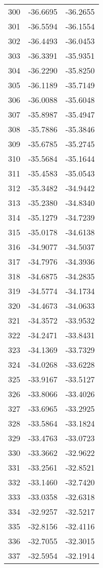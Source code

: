 \documentclass{article}
\begin{document}
\begin{longtable}{|c|c|c|}
300 & -36.6695 & -36.2655 \\
301 & -36.5594 & -36.1554 \\
302 & -36.4493 & -36.0453 \\
303 & -36.3391 & -35.9351 \\
304 & -36.2290 & -35.8250 \\
305 & -36.1189 & -35.7149 \\
306 & -36.0088 & -35.6048 \\
307 & -35.8987 & -35.4947 \\
308 & -35.7886 & -35.3846 \\
309 & -35.6785 & -35.2745 \\
310 & -35.5684 & -35.1644 \\
311 & -35.4583 & -35.0543 \\
312 & -35.3482 & -34.9442 \\
313 & -35.2380 & -34.8340 \\
314 & -35.1279 & -34.7239 \\
315 & -35.0178 & -34.6138 \\
316 & -34.9077 & -34.5037 \\
317 & -34.7976 & -34.3936 \\
318 & -34.6875 & -34.2835 \\
319 & -34.5774 & -34.1734 \\
320 & -34.4673 & -34.0633 \\
321 & -34.3572 & -33.9532 \\
322 & -34.2471 & -33.8431 \\
323 & -34.1369 & -33.7329 \\
324 & -34.0268 & -33.6228 \\
325 & -33.9167 & -33.5127 \\
326 & -33.8066 & -33.4026 \\
327 & -33.6965 & -33.2925 \\
328 & -33.5864 & -33.1824 \\
329 & -33.4763 & -33.0723 \\
330 & -33.3662 & -32.9622 \\
331 & -33.2561 & -32.8521 \\
332 & -33.1460 & -32.7420 \\
333 & -33.0358 & -32.6318 \\
334 & -32.9257 & -32.5217 \\
335 & -32.8156 & -32.4116 \\
336 & -32.7055 & -32.3015 \\
337 & -32.5954 & -32.1914 \\

\end{longtable}
\end{document}
